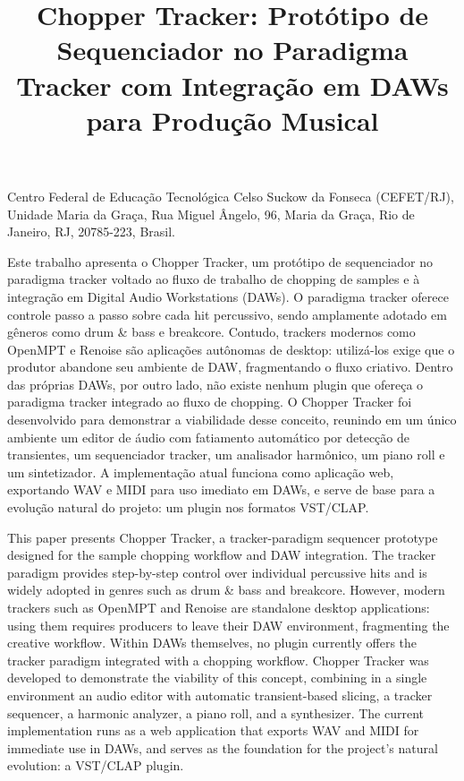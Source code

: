 \documentclass[portuguese]{sbc2025}
\title{Chopper Tracker: Protótipo de Sequenciador no Paradigma Tracker com Integração em DAWs para Produção Musical}
\author[Ribeiro 2026]{
\affil{\textbf{Yan Ribeiro}~\textcolor{blue}{\faEnvelopeO}~~[{Centro Federal de Educação Tecnológica Celso Suckow da Fonseca (CEFET/RJ)}~|\href{mailto:yanribeironasc@gmail.com}{~{\textit{yanribeironasc@gmail.com}}}~]}
}
\begin{document}
\begin{frontmatter}

\maketitle

\begin{mail}
Centro Federal de Educação Tecnológica Celso Suckow da Fonseca (CEFET/RJ), Unidade Maria da Graça, Rua Miguel Ângelo, 96, Maria da Graça, Rio de Janeiro, RJ, 20785-223, Brasil.
\end{mail}

\begin{abstract-pt}
Este trabalho apresenta o Chopper Tracker, um protótipo de sequenciador no paradigma tracker voltado ao fluxo de trabalho de chopping de samples e à integração em Digital Audio Workstations (DAWs). O paradigma tracker oferece controle passo a passo sobre cada hit percussivo, sendo amplamente adotado em gêneros como drum \& bass e breakcore. Contudo, trackers modernos como OpenMPT e Renoise são aplicações autônomas de desktop: utilizá-los exige que o produtor abandone seu ambiente de DAW, fragmentando o fluxo criativo. Dentro das próprias DAWs, por outro lado, não existe nenhum plugin que ofereça o paradigma tracker integrado ao fluxo de chopping. O Chopper Tracker foi desenvolvido para demonstrar a viabilidade desse conceito, reunindo em um único ambiente um editor de áudio com fatiamento automático por detecção de transientes, um sequenciador tracker, um analisador harmônico, um piano roll e um sintetizador. A implementação atual funciona como aplicação web, exportando WAV e MIDI para uso imediato em DAWs, e serve de base para a evolução natural do projeto: um plugin nos formatos VST/CLAP.
\end{abstract-pt}

\begin{abstract-en}
This paper presents Chopper Tracker, a tracker-paradigm sequencer prototype designed for the sample chopping workflow and DAW integration. The tracker paradigm provides step-by-step control over individual percussive hits and is widely adopted in genres such as drum \& bass and breakcore. However, modern trackers such as OpenMPT and Renoise are standalone desktop applications: using them requires producers to leave their DAW environment, fragmenting the creative workflow. Within DAWs themselves, no plugin currently offers the tracker paradigm integrated with a chopping workflow. Chopper Tracker was developed to demonstrate the viability of this concept, combining in a single environment an audio editor with automatic transient-based slicing, a tracker sequencer, a harmonic analyzer, a piano roll, and a synthesizer. The current implementation runs as a web application that exports WAV and MIDI for immediate use in DAWs, and serves as the foundation for the project's natural evolution: a VST/CLAP plugin.
\end{abstract-en}


\end{frontmatter}
\end{document}
